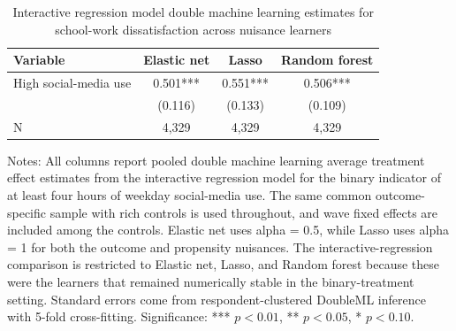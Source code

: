 \begin{table}[!htbp]
\centering
\caption{Interactive regression model double machine learning estimates for school-work dissatisfaction across nuisance learners}
\label{tab:irm_schoolwork_methods}
\begin{tabular}{lccc}
\hline
Variable & Elastic net & Lasso & Random forest
\\
\hline
High social-media use & 0.501*** & 0.551*** & 0.506***
\\
 & (0.116) & (0.133) & (0.109)
\\
N & 4,329 & 4,329 & 4,329
\\
\hline
\end{tabular}
\begin{minipage}{0.95\textwidth}
\footnotesize Notes: All columns report pooled double machine learning average treatment effect estimates from the interactive regression model for the binary indicator of at least four hours of weekday social-media use. The same common outcome-specific sample with rich controls is used throughout, and wave fixed effects are included among the controls. Elastic net uses alpha = 0.5, while Lasso uses alpha = 1 for both the outcome and propensity nuisances. The interactive-regression comparison is restricted to Elastic net, Lasso, and Random forest because these were the learners that remained numerically stable in the binary-treatment setting. Standard errors come from respondent-clustered DoubleML inference with 5-fold cross-fitting. Significance: *** \(p < 0.01\), ** \(p < 0.05\), * \(p < 0.10\).
\end{minipage}
\end{table}
